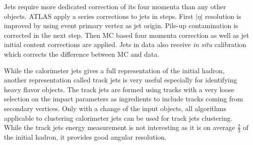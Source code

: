 Jets require more dedicated correction of its four momenta than any other objects. ATLAS apply a series corrections\cite{PERF-2016-04} to jets in steps. First $|\eta|$ resolution is improved by using event primary vertex as jet origin. Pile-up contamination is corrected in the next step. Then MC based four momenta correction as well as jet initial content corrections are applied. Jets in data also receive \textit{in situ} calibration which corrects the difference between MC and data.

While the calorimeter jets gives a full representation of the initial hadron, another representation called track jets is very useful especially for identifying heavy flavor objects. The track jets are formed using tracks with a very loose selection on the impact parameters as ingredients to include tracks coming from secondary vertices. Only with a change of the input objects, all algorithms applicable to clustering calorimeter jets can be used for track jets clustering. While the track jets energy measurement is not interesting as it is on average $\frac{2}{3}$ of the initial hadron, it provides good angular resolution. 
